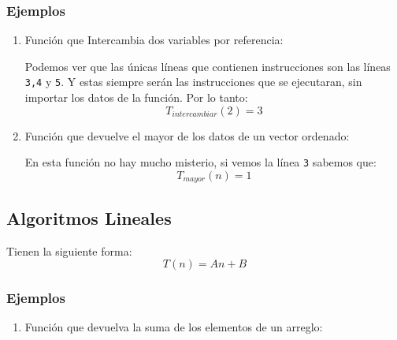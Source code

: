 \subsubsection{Ejemplos}
\begin{enumerate}
\item Función que Intercambia dos variables por referencia:

Podemos ver que las únicas líneas que contienen instrucciones son las líneas \texttt{3,4} y \texttt{5}. Y estas siempre serán las instrucciones que se ejecutaran, sin importar los datos de la función. Por lo tanto:
$$T_{intercambiar}(2)=3$$
\item Función que devuelve el mayor de los datos de un vector ordenado:

En esta función no hay mucho misterio, si vemos la línea \texttt{3} sabemos que:
$$T_{mayor}(n)=1$$
\end{enumerate}
\subsection{Algoritmos Lineales}
Tienen la siguiente forma:
$$T(n)=An+B$$
\subsubsection{Ejemplos}
\begin{enumerate}
\item Función que devuelva la suma de los elementos de un arreglo:

\end{enumerate}
